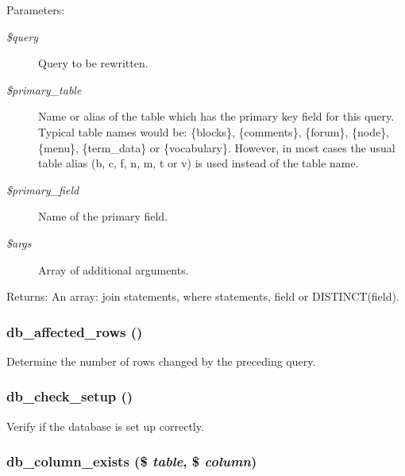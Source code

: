 \begin{Desc}
\item[Parameters:]
\begin{description}
\item[{\em \$query}]Query to be rewritten. \item[{\em \$primary\_\-table}]Name or alias of the table which has the primary key field for this query. Typical table names would be: \{blocks\}, \{comments\}, \{forum\}, \{node\}, \{menu\}, \{term\_\-data\} or \{vocabulary\}. However, in most cases the usual table alias (b, c, f, n, m, t or v) is used instead of the table name. \item[{\em \$primary\_\-field}]Name of the primary field. \item[{\em \$args}]Array of additional arguments. \end{description}
\end{Desc}
\begin{Desc}
\item[Returns:]An array: join statements, where statements, field or DISTINCT(field). \end{Desc}
\hypertarget{group__database_ge3bc677fbeebd688068ce3b413ac2944}{
\subsubsection[{db\_\-affected\_\-rows}]{\setlength{\rightskip}{0pt plus 5cm}db\_\-affected\_\-rows ()}}
\label{group__database_ge3bc677fbeebd688068ce3b413ac2944}


Determine the number of rows changed by the preceding query. \hypertarget{group__database_g7ba830a719ea0847a983f70ade811880}{
\subsubsection[{db\_\-check\_\-setup}]{\setlength{\rightskip}{0pt plus 5cm}db\_\-check\_\-setup ()}}
\label{group__database_g7ba830a719ea0847a983f70ade811880}


Verify if the database is set up correctly. \hypertarget{group__database_g3d649bb8d8b9a7222c0bded9d7e2785a}{
\subsubsection[{db\_\-column\_\-exists}]{\setlength{\rightskip}{0pt plus 5cm}db\_\-column\_\-exists (\$ {\em table}, \/  \$ {\em column})}}
\label{group__database_g3d649bb8d8b9a7222c0bded9d7e2785a}


